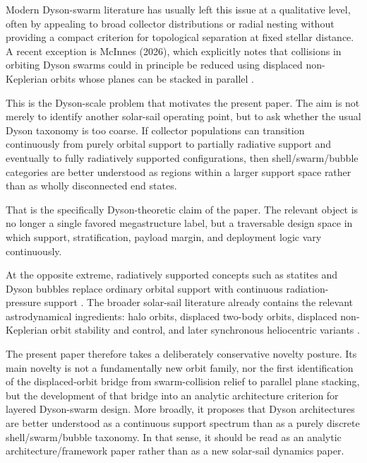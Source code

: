 \documentclass[11pt]{article}
\begin{document}
Modern Dyson-swarm literature has usually left this issue at a qualitative level, often by
appealing to broad collector distributions or radial nesting without providing a compact
criterion for topological separation at fixed stellar distance. A recent exception is
McInnes (2026), which explicitly notes that collisions in orbiting Dyson swarms could in
principle be reduced using displaced non-Keplerian orbits whose planes can be stacked in
parallel \cite{wright2015gies,mcinnes2025ringworlds,mcinnes2026bubbles}.

This is the Dyson-scale problem that motivates the present paper. The aim is not merely to
identify another solar-sail operating point, but to ask whether the usual Dyson taxonomy is
too coarse. If collector populations can transition continuously from purely orbital support
to partially radiative support and eventually to fully radiatively supported configurations,
then shell/swarm/bubble categories are better understood as regions within a larger support
space rather than as wholly disconnected end states.

That is the specifically Dyson-theoretic claim of the paper. The relevant object is no longer
a single favored megastructure label, but a traversable design space in which support,
stratification, payload margin, and deployment logic vary continuously.

At the opposite extreme, radiatively supported concepts such as statites and Dyson bubbles
replace ordinary orbital support with continuous radiation-pressure support
\cite{forward1991statite,mcinnes1999solarsailing}. The broader solar-sail literature already
contains the relevant astrodynamical ingredients: halo orbits, displaced two-body orbits,
displaced non-Keplerian orbit stability and control, and later synchronous heliocentric
variants \cite{mcinnes1992haloorbits1,mcinnes1992haloorbits2,mcinnes1997displaced,mcinnes1998dnko,quarta2020earthsync,bassetto2024marssync}.

The present paper therefore takes a deliberately conservative novelty posture. Its main
novelty is not a fundamentally new orbit family, nor the first identification of the
displaced-orbit bridge from swarm-collision relief to parallel plane stacking, but the
development of that bridge into an analytic architecture criterion for layered Dyson-swarm
design. More broadly, it proposes that Dyson architectures are better understood as a
continuous support spectrum than as a purely discrete shell/swarm/bubble taxonomy. In that
sense, it should be read as an analytic architecture/framework paper rather than as a new
solar-sail dynamics paper.
\end{document}
